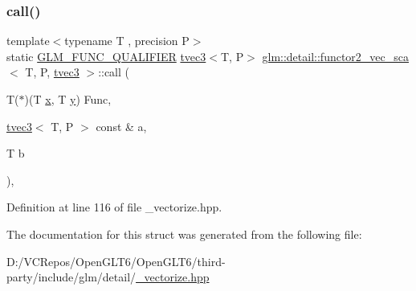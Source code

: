 \subsubsection{\texorpdfstring{call()}{call()}}
{\footnotesize\ttfamily template$<$typename T , precision P$>$ \\
static \mbox{\hyperlink{setup_8hpp_a33fdea6f91c5f834105f7415e2a64407}{G\+L\+M\+\_\+\+F\+U\+N\+C\+\_\+\+Q\+U\+A\+L\+I\+F\+I\+ER}} \mbox{\hyperlink{structglm_1_1tvec3}{tvec3}}$<$T, P$>$ \mbox{\hyperlink{structglm_1_1detail_1_1functor2__vec__sca}{glm\+::detail\+::functor2\+\_\+vec\+\_\+sca}}$<$ T, P, \mbox{\hyperlink{structglm_1_1tvec3}{tvec3}} $>$\+::call (\begin{DoxyParamCaption}\item[{T($\ast$)(T \mbox{\hyperlink{glad_8h_a92d0386e5c19fb81ea88c9f99644ab1d}{x}}, T \mbox{\hyperlink{glad_8h_a66ddd433d2cacfe27f5906b7e86faeed}{y}})}]{Func,  }\item[{\mbox{\hyperlink{structglm_1_1tvec3}{tvec3}}$<$ T, P $>$ const \&}]{a,  }\item[{T}]{b }\end{DoxyParamCaption})\hspace{0.3cm}{\ttfamily [inline]}, {\ttfamily [static]}}



Definition at line 116 of file \+\_\+vectorize.\+hpp.



The documentation for this struct was generated from the following file\+:\begin{DoxyCompactItemize}
\item 
D\+:/\+V\+C\+Repos/\+Open\+G\+L\+T6/\+Open\+G\+L\+T6/third-\/party/include/glm/detail/\mbox{\hyperlink{__vectorize_8hpp}{\+\_\+vectorize.\+hpp}}\end{DoxyCompactItemize}
